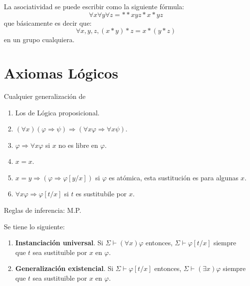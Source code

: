\documentclass[12pt]{report}
\newcounter{it}
\theoremstyle{largebreak}
\begin{document}
    \begin{exa}
        La asociatividad se puede escribir como la siguiente fórmula:
        \begin{equation*}
            \forall x\forall y\forall z=**xyz*x*yz
        \end{equation*}
        que básicamente es decir que:
        \begin{equation*}
            \forall x,y,z, (x*y)*z=x*(y*z)
        \end{equation*}
        en un grupo cualquiera.
    \end{exa}

    \section{Axiomas Lógicos}

    Cualquier generalización de 
    \begin{enumerate}
        \item Los de Lógica proposicional.
        \item $(\forall x)(\varphi\Rightarrow \psi)\Rightarrow (\forall x\varphi\Rightarrow\forall x\psi)$.
        \item $\varphi\Rightarrow\forall x\varphi$ si $x$ no es libre en $\varphi$.
        \item $x=x$.
        \item $x=y\Rightarrow(\varphi\Rightarrow\varphi\left[y/x\right])$ si $\varphi$ es atómica, esta sustitución es para algunas $x$.
        \item $\forall x\varphi\Rightarrow\varphi\left[t/x \right]$ si $t$ es sustitubile por $x$.
    \end{enumerate}

    Reglas de inferencia: M.P.

    \begin{theor}
        Se tiene lo siguiente:
        \begin{enumerate}
            \item \textbf{Instanciación universal}. Si $\Sigma\vdash(\forall x)\varphi$ entonces, $\Sigma\vdash\varphi[t/x]$ siempre que $t$ sea sustituible por $x$ en $\varphi$.
            \item \textbf{Generalización existencial}. Si $\Sigma\vdash\varphi[t/x]$ entonces, $\Sigma\vdash\left(\exists x \right)\varphi$ siempre que $t$ sea sustituible por $x$ en $\varphi$.
        \end{enumerate}
    \end{theor}
\end{document}
